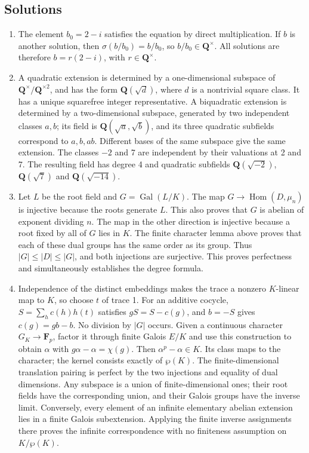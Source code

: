 \documentclass[11pt,a4paper]{article}
\newcommand{\tightlist}{\setlength{\itemsep}{0pt}\setlength{\parskip}{0pt}}
\begin{document}
\subsection{Solutions}\label{solutions}

\begin{enumerate}
\def\labelenumi{\arabic{enumi}.}
\tightlist
\item
  The element \(b_0=2-i\) satisfies the equation by direct
  multiplication. If \(b\) is another solution, then
  \(\sigma(b/b_0)=b/b_0\), so \(b/b_0\in\mathbf Q^\times\). All
  solutions are therefore \(b=r(2-i)\), with \(r\in\mathbf Q^\times\).
\item
  A quadratic extension is determined by a one-dimensional subspace of
  \(\mathbf Q^\times/\mathbf Q^{\times2}\), and has the form
  \(\mathbf Q(\sqrt d)\), where \(d\) is a nontrivial square class. It
  has a unique squarefree integer representative. A biquadratic
  extension is determined by a two-dimensional subspace, generated by
  two independent classes \(a,b\); its field is
  \(\mathbf Q(\sqrt a,\sqrt b)\), and its three quadratic subfields
  correspond to \(a,b,ab\). Different bases of the same subspace give
  the same extension. The classes \(-2\) and 7 are independent by their
  valuations at 2 and 7. The resulting field has degree 4 and quadratic
  subfields \(\mathbf Q(\sqrt{-2})\), \(\mathbf Q(\sqrt7)\) and
  \(\mathbf Q(\sqrt{-14})\).
\item
  Let \(L\) be the root field and \(G=\operatorname{Gal}(L/K)\). The map
  \(G\to\operatorname{Hom}(D,\mu_n)\) is injective because the roots
  generate \(L\). This also proves that \(G\) is abelian of exponent
  dividing \(n\). The map in the other direction is injective because a
  root fixed by all of \(G\) lies in \(K\). The finite character lemma
  above proves that each of these dual groups has the same order as its
  group. Thus \(|G|\leq|D|\leq|G|\), and both injections are surjective.
  This proves perfectness and simultaneously establishes the degree
  formula.
\item
  Independence of the distinct embeddings makes the trace a nonzero
  \(K\)-linear map to \(K\), so choose \(t\) of trace 1. For an additive
  cocycle, \(S=\sum_h c(h)h(t)\) satisfies \(gS=S-c(g)\), and \(b=-S\)
  gives \(c(g)=gb-b\). No division by \(|G|\) occurs. Given a continuous
  character \(G_K\to\mathbf F_p\), factor it through finite Galois
  \(E/K\) and use this construction to obtain \(\alpha\) with
  \(g\alpha-\alpha=\chi(g)\). Then \(\alpha^p-\alpha\in K\). Its class
  maps to the character; the kernel consists exactly of \(\wp(K)\). The
  finite-dimensional translation pairing is perfect by the two
  injections and equality of dual dimensions. Any subspace is a union of
  finite-dimensional ones; their root fields have the corresponding
  union, and their Galois groups have the inverse limit. Conversely,
  every element of an infinite elementary abelian extension lies in a
  finite Galois subextension. Applying the finite inverse assignments
  there proves the infinite correspondence with no finiteness assumption
  on \(K/\wp(K)\).
\end{enumerate}
\end{document}

